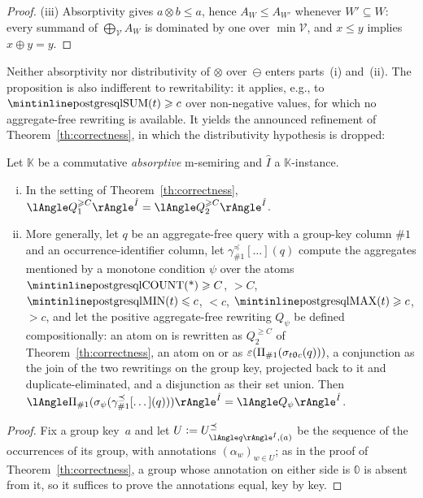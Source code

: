 \begin{toappendix}
\begin{proof}
  (iii) Absorptivity gives $a\otimes b\le a$, hence $A_W\le A_{W'}$
  whenever $W'\subseteq W$: every summand of
  $\bigoplus_{\mathcal V}A_W$ is dominated by one over
  $\min\mathcal V$, and $x\le y$ implies $x\oplus y=y$.
\end{proof}
Neither absorptivity nor distributivity of $\otimes$ over~$\ominus$
enters parts~(i) and~(ii). The proposition is also indifferent to
rewritability: it applies, e.g., to $\text{\sql{SUM}}(t)\geq c$ over
non-negative values, for which no aggregate-free rewriting is
available. It yields the announced refinement of
Theorem~\ref{th:correctness}, in which the distributivity hypothesis
is dropped:

\begin{theorem}\label{th:monotone}
  Let $\mathbb K$ be a commutative \emph{absorptive} m-semiring and
  $\hat I$ a $\mathbb K$-instance.
  \begin{enumerate}[(i)]
    \item
      In the setting of Theorem~\ref{th:correctness},
      $\angsem{\hat I}{Q^{\geq C}_1}=\angsem{\hat I}{Q^{\geq C}_2}$.
    \item
      More generally, let $q$ be an aggregate-free query with a
      group-key column $\#1$ and an occurrence-identifier column, let
      $\gamma^{\preceq}_{\#1}[\dots](q)$ compute the aggregates
      mentioned by a monotone condition $\psi$ over the atoms
      $\text{\sql{COUNT(*)}}\geq C$, $>C$,
      $\text{\sql{MIN}}(t)\leq c$, $<c$, $\text{\sql{MAX}}(t)\geq c$,
      $>c$, and let the positive aggregate-free rewriting $Q_\psi$ be
      defined compositionally: an atom on  is rewritten
      as $Q^{\geq C}_2$ of Theorem~\ref{th:correctness}, an atom on
       or  as
      $\varepsilon(\Pi_{\#1}(\sigma_{t\mathrel{\uptheta} c}(q)))$, a conjunction as
      the join of the two rewritings on the group key, projected back
      to it and duplicate-eliminated, and a
      disjunction as their set union. Then
      $\angsem{\hat
      I}{\Pi_{\#1}(\sigma_\psi(\gamma^{\preceq}_{\#1}[\dots](q)))}
      =\angsem{\hat I}{Q_\psi}$.
  \end{enumerate}
\end{theorem}
\begin{proof}
  Fix a group key~$a$ and let
  $U\defeq U^{\preceq}_{\angsem{\hat I}{q},(a)}$ be the sequence of
  the occurrences of its group, with annotations
  $(\alpha_w)_{w\in U}$; as in the proof of
  Theorem~\ref{th:correctness}, a group whose annotation on either
  side is $\mathbb 0$ is absent from it, so it suffices to prove the
  annotations equal, key by key.


\end{proof}
\end{toappendix}
